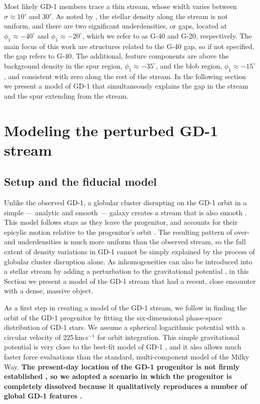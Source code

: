 \documentclass[twocolumn]{aastex62}
\newcommand{\changes}[1]{{\textbf{#1}}}
\begin{document}
Most likely GD-1 members trace a thin stream, whose width varies between $\sigma\approx10'$ and $30'$.
As noted by \citet{pwb}, the stellar density along the stream is not uniform, and there are two significant underdensities, or gaps, located at $\phi_1\approx-40^\circ$ and $\phi_1\approx-20^\circ$, which we refer to as G-40 and G-20, respectively.
The main focus of this work are structures related to the G-40 gap, so if not specified, the gap refers to G-40.
The additional, feature components are above the background density in the spur region, $\phi_1\approx-35^\circ$, and the blob region, $\phi_1\approx-15^\circ$, and consistent with zero along the rest of the stream.
In the following section we present a model of GD-1 that simultaneously explains the gap in the stream and the spur extending from the stream.

\section{Modeling the perturbed GD-1 stream}
\subsection{Setup and the fiducial model}
\label{sec:model}
Unlike the observed GD-1, a globular cluster disrupting on the GD-1 orbit in a simple --- analytic and smooth --- galaxy creates a stream that is also smooth \citep{pwb}.
This model follows stars as they leave the progenitor, and accounts for their epicylic motion relative to the progenitor's orbit \citep{kupper2008, kupper2010, fardal2015}.
The resulting pattern of over- and underdensities is much more uniform than the observed stream, so the full extent of density variations in GD-1 cannot be simply explained by the process of globular cluster disruption alone.
As inhomogeneities can also be introduced into a stellar stream by adding a perturbation to the gravitational potential \citep[e.g.,][]{sgv2008}, in this Section we present a model of the GD-1 stream that had a recent, close encounter with a dense, massive object.

As a first step in creating a model of the GD-1 stream, we follow \citet{pwb} in finding the orbit of the GD-1 progenitor by fitting the six-dimensional phase-space distribution of GD-1 stars.
We assume a spherical logarithmic potential with a circular velocity of 225\,km\,s$^{-1}$ for orbit integration.
This simple gravitational potential is very close to the best-fit model of GD-1 \citep{koposov2010, bowden2015}, and it also allows much faster force evaluations than the standard, multi-component model of the Milky Way.
\changes{The present-day location of the GD-1 progenitor is not firmly established \citep[e.g.,][]{pwb, webb2019}, so we adopted a scenario in which the progenitor is completely dissolved because it qualitatively reproduces a number of global GD-1 features \citep[see][]{pwb}.}
\end{document}
